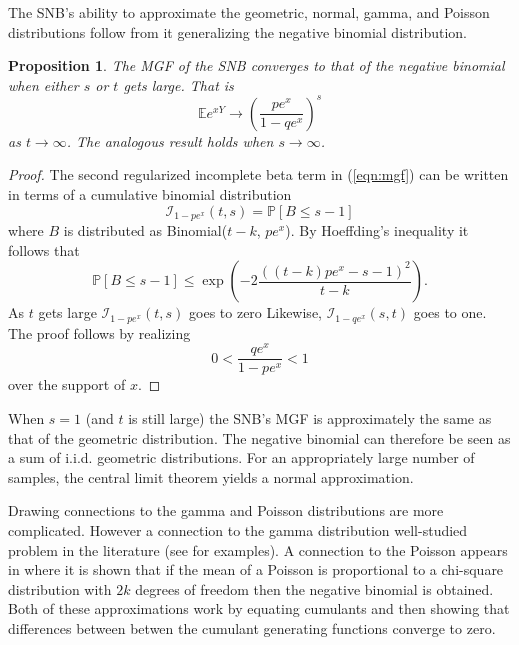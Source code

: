 \documentclass[review]{elsarticle}
\newtheorem{prop}{Proposition}
\begin{document}
The SNB's ability to approximate the geometric, normal, gamma, and Poisson
distributions follow from it generalizing the negative binomial distribution. 
\begin{prop}
The MGF of the SNB converges to that of the negative binomial when either
$s$ or $t$ gets large. That is
\begin{equation*}
\mathbb{E} e^{xY} \rightarrow \left( \frac{pe^x}{1-qe^x} \right)^s
\end{equation*}
as $t \rightarrow \infty$. The analogous result holds when 
$s \rightarrow \infty$.
\end{prop}
\begin{proof}
The second regularized incomplete beta term in (\ref{eqn:mgf}) can be written
in terms of a cumulative binomial distribution
\begin{equation*}
\mathcal{I}_{1-pe^x}(t, s) = \mathbb{P}\left[ B \leq s-1 \right]
\end{equation*}
where $B$ is distributed as
Binomial($t-k$, $pe^x$). By Hoeffding's inequality \cite{Hoeffding1963}
it follows that
\begin{equation} \label{eqn:hoeffding}
\mathbb{P}\left[ B \leq s-1 \right] \leq 
  \exp \left(-2\frac{((t-k)pe^x - s-1)^2}{t-k} \right).
\end{equation}
As $t$ gets large $\mathcal{I}_{1-pe^x}(t, s)$ goes to zero
Likewise, $\mathcal{I}_{1-qe^x}(s, t)$ goes
to one. The proof follows by realizing 
\begin{equation*}
0 < \frac{qe^x}{1-pe^x} < 1
\end{equation*}
over the support of $x$.
\end{proof}

When $s=1$ (and $t$ is still large) the SNB's MGF is approximately 
the same as that of the
geometric distribution. The negative
binomial can therefore be seen as a sum of i.i.d. geometric distributions.
For an appropriately large number of samples, the central limit theorem
yields a normal approximation.

Drawing connections to the gamma and Poisson distributions are more complicated.
However a connection to the gamma distribution well-studied problem in the 
literature (see \cite{Ord1968,Guenther1972,Best1974} for examples). 
A connection to the Poisson appears in \cite{Anscombe1950} where
it is shown that if the mean of a Poisson is proportional
to a chi-square distribution with $2k$ degrees of freedom
then the negative binomial is obtained. 
Both of these approximations work by equating cumulants and then showing 
that differences between betwen the cumulant generating
functions converge to zero.
\end{document}
